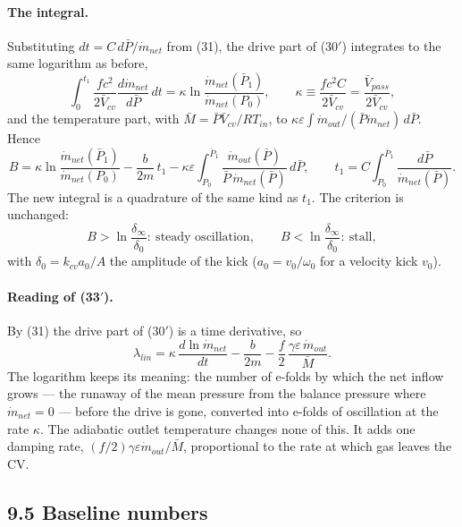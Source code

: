 \documentclass[11pt]{article}
\begin{document}
\paragraph{The integral.} Substituting $dt = C\,d\bar P/\dot m_{net}$ from (31), the drive part of (30$'$) integrates to the same logarithm as before,
\begin{equation}
\int_0^{t_1}\frac{fc^2}{2\bar V_{cv}}\frac{d\dot m_{net}}{d\bar P}\,dt = \kappa\ln\frac{\dot m_{net}(\bar P_1)}{\dot m_{net}(P_0)}, \qquad \kappa \equiv \frac{fc^2C}{2\bar V_{cv}} = \frac{\bar V_{pass}}{2\bar V_{cv}} , \tag{32}
\end{equation}
and the temperature part, with $\bar M = \bar P\bar V_{cv}/RT_{in}$, to $\kappa\varepsilon\int\dot m_{out}/(\bar P\dot m_{net})\,d\bar P$. Hence
\begin{equation}
B = \kappa\ln\frac{\dot m_{net}(\bar P_1)}{\dot m_{net}(P_0)} - \frac{b}{2m}\,t_1 - \kappa\varepsilon\int_{P_0}^{\bar P_1}\frac{\dot m_{out}(\bar P)}{\bar P\,\dot m_{net}(\bar P)}\,d\bar P, \qquad
t_1 = C\int_{P_0}^{\bar P_1}\frac{d\bar P}{\dot m_{net}(\bar P)} . \tag{33$'$}
\end{equation}
The new integral is a quadrature of the same kind as $t_1$. The criterion is unchanged:
\begin{equation}
B > \ln\frac{\delta_\infty}{\delta_0}: \ \text{steady oscillation}, \qquad B < \ln\frac{\delta_\infty}{\delta_0}: \ \text{stall} , \tag{34}
\end{equation}
with $\delta_0 = k_{cv}a_0/A$ the amplitude of the kick ($a_0 = v_0/\omega_0$ for a velocity kick $v_0$).

\paragraph{Reading of (33$'$).} By (31) the drive part of (30$'$) is a time derivative, so
\[
\lambda_{lin} = \kappa\,\frac{d\ln\dot m_{net}}{dt} - \frac{b}{2m} - \frac{f}{2}\,\frac{\gamma\varepsilon\,\dot m_{out}}{\bar M} .
\]
The logarithm keeps its meaning: the number of e-folds by which the net inflow grows --- the runaway of the mean pressure from the balance pressure where $\dot m_{net} = 0$ --- before the drive is gone, converted into e-folds of oscillation at the rate $\kappa$. The adiabatic outlet temperature changes none of this. It adds one damping rate, $(f/2)\gamma\varepsilon\dot m_{out}/\bar M$, proportional to the rate at which gas leaves the CV.

\subsection*{9.5 Baseline numbers}
\end{document}
